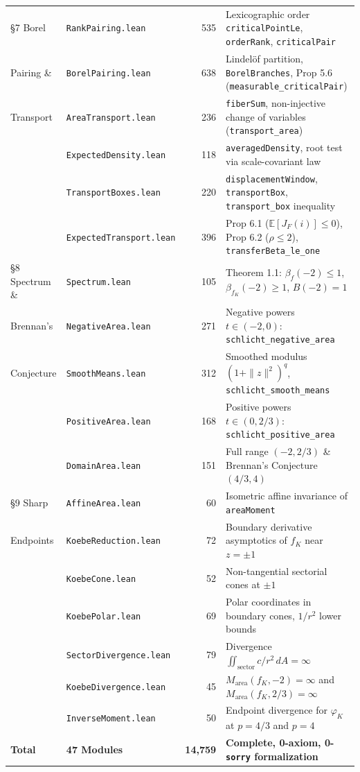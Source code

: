 \documentclass[11pt,reqno]{amsart}
\theoremstyle{definition}
\newcommand{\E}{\mathbb{E}}
\begin{document}
\begin{longtable}{@{}llrl@{}}
\midrule
\S7 Borel & \texttt{RankPairing.lean} & 535 & Lexicographic order \texttt{criticalPointLe}, \texttt{orderRank}, \texttt{criticalPair} \\
\quad Pairing \& & \texttt{BorelPairing.lean} & 638 & Lindel\"of partition, \texttt{BorelBranches}, Prop 5.6 (\texttt{measurable\_criticalPair}) \\
\quad Transport & \texttt{AreaTransport.lean} & 236 & \texttt{fiberSum}, non-injective change of variables (\texttt{transport\_area}) \\
 & \texttt{ExpectedDensity.lean} & 118 & \texttt{averagedDensity}, root test via scale-covariant law \\
 & \texttt{TransportBoxes.lean} & 220 & \texttt{displacementWindow}, \texttt{transportBox}, \texttt{transport\_box} inequality \\
 & \texttt{ExpectedTransport.lean} & 396 & Prop 6.1 ($\E[J_F(i)] \le 0$), Prop 6.2 ($\rho \le 2$), \texttt{transferBeta\_le\_one} \\
\midrule
\S8 Spectrum \& & \texttt{Spectrum.lean} & 105 & Theorem 1.1: $\beta_f(-2) \le 1$, $\beta_{f_K}(-2) \ge 1$, $B(-2) = 1$ \\
\quad Brennan's & \texttt{NegativeArea.lean} & 271 & Negative powers $t \in (-2,0)$: \texttt{schlicht\_negative\_area} \\
\quad Conjecture & \texttt{SmoothMeans.lean} & 312 & Smoothed modulus $(1+\|z\|^2)^q$, \texttt{schlicht\_smooth\_means} \\
 & \texttt{PositiveArea.lean} & 168 & Positive powers $t \in (0, 2/3)$: \texttt{schlicht\_positive\_area} \\
 & \texttt{DomainArea.lean} & 151 & Full range $(-2,2/3)$ \& Brennan's Conjecture $(4/3,4)$ \\
\midrule
\S9 Sharp & \texttt{AffineArea.lean} & 60 & Isometric affine invariance of \texttt{areaMoment} \\
\quad Endpoints & \texttt{KoebeReduction.lean} & 72 & Boundary derivative asymptotics of $f_K$ near $z = \pm 1$ \\
 & \texttt{KoebeCone.lean} & 52 & Non-tangential sectorial cones at $\pm 1$ \\
 & \texttt{KoebePolar.lean} & 69 & Polar coordinates in boundary cones, $1/r^2$ lower bounds \\
 & \texttt{SectorDivergence.lean} & 79 & Divergence $\iint_{\text{sector}} c/r^2\,dA = \infty$ \\
 & \texttt{KoebeDivergence.lean} & 45 & $M_{\text{area}}(f_K, -2) = \infty$ and $M_{\text{area}}(f_K, 2/3) = \infty$ \\
 & \texttt{InverseMoment.lean} & 50 & Endpoint divergence for $\varphi_K$ at $p=4/3$ and $p=4$ \\
\midrule
\textbf{Total} & \textbf{47 Modules} & \textbf{14,759} & \textbf{Complete, 0-axiom, 0-\texttt{sorry} formalization} \\
\end{longtable}
\end{document}
